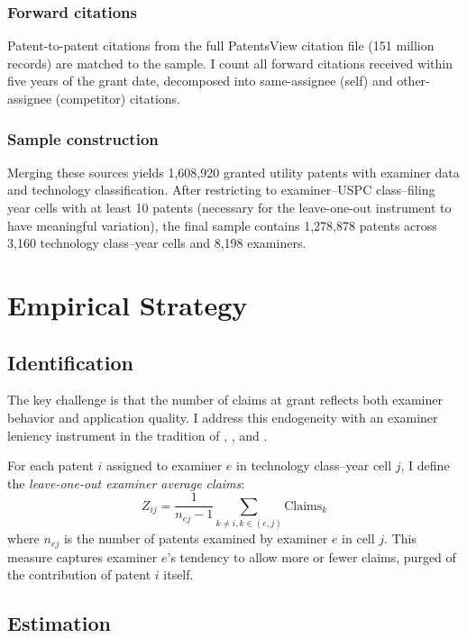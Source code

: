 \documentclass[12pt]{article}
\begin{document}
\subsubsection*{Forward citations} Patent-to-patent citations from the full PatentsView citation file (151 million records) are matched to the sample. I count all forward citations received within five years of the grant date, decomposed into same-assignee (self) and other-assignee (competitor) citations.

\subsubsection*{Sample construction} Merging these sources yields 1,608,920 granted utility patents with examiner data and technology classification. After restricting to examiner--USPC class--filing year cells with at least 10 patents (necessary for the leave-one-out instrument to have meaningful variation), the final sample contains 1,278,878 patents across 3,160 technology class--year cells and 8,198 examiners.



\section{Empirical Strategy}

\subsection{Identification}

The key challenge is that the number of claims at grant reflects both examiner behavior and application quality. I address this endogeneity with an examiner leniency instrument in the tradition of \citet{kling2006}, \citet{sampat2019}, and \citet{farre2020}.

For each patent $i$ assigned to examiner $e$ in technology class--year cell $j$, I define the \emph{leave-one-out examiner average claims}:
\begin{equation}
Z_{ij} = \frac{1}{n_{ej} - 1} \sum_{k \neq i, k \in (e,j)} \text{Claims}_k
\end{equation}
where $n_{ej}$ is the number of patents examined by examiner $e$ in cell $j$. This measure captures examiner $e$'s tendency to allow more or fewer claims, purged of the contribution of patent $i$ itself.

\subsection{Estimation}
\end{document}
